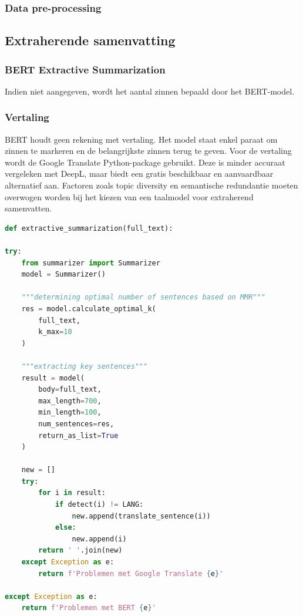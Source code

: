 \subsubsection{Data pre-processing}


\subsection{Extraherende samenvatting}

\subsubsection{BERT Extractive Summarization}

Indien niet aangegeven, wordt het aantal zinnen bepaald door het BERT-model.

\subsubsection{Vertaling}

BERT houdt geen rekening met vertaling. Het model staat enkel paraat om zinnen te markeren en de belangrijkste zinnen terug te geven. Voor de vertaling wordt de Google Translate Python-package gebruikt. Deze is minder accuraat vergeleken met DeepL, maar biedt een gratis beschikbaar en aanvaardbaar alternatief aan. Factoren zoals topic diversity en semantische redundantie moeten overwogen worden bij het kiezen van een taalmodel voor extraherend samenvatten.

\begin{lstlisting}[language=Python]
def extractive_summarization(full_text):

try:    
    from summarizer import Summarizer
    model = Summarizer()

    """determining optimal number of sentences based on MMR"""
    res = model.calculate_optimal_k(
        full_text, 
        k_max=10
    )

    """extracting key sentences"""
    result = model(
        body=full_text,
        max_length=700,
        min_length=100,
        num_sentences=res,
        return_as_list=True
    )

    new = []
    try:
        for i in result:
            if detect(i) != LANG:
                new.append(translate_sentence(i))
            else:
                new.append(i)
        return ' '.join(new)
    except Exception as e:
        return f'Problemen met Google Translate {e}'

except Exception as e:
    return f'Problemen met BERT {e}'
\end{lstlisting}


